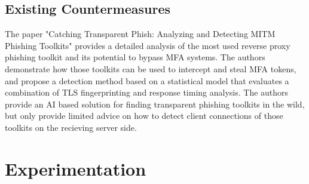 \documentclass[12pt]{report}
\begin{document}
\section{Existing Countermeasures}
The paper "Catching Transparent Phish: Analyzing and Detecting MITM Phishing Toolkits" \cite{kondracki2021catching} provides a detailed
analysis of the most used reverse proxy phishing toolkit and its potential to
bypass MFA systems. The authors demonstrate how those toolkits can be used to intercept
and steal MFA tokens, and propose a detection method based on a statistical
model that evaluates a combination of TLS fingerprinting and response timing
analysis. The authors provide an AI based solution for finding transparent phishing
toolkits in the wild, but only provide limited advice on how to detect client
connections of those toolkits on the recieving server side.

\newpage
\chapter{Experimentation}
\end{document}
